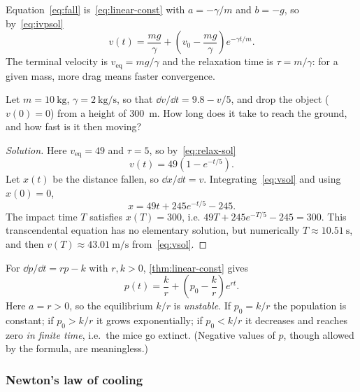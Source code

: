 \begin{eg}
	Equation~\eqref{eq:fall} is~\eqref{eq:linear-const} with \(a = -\gamma/m\) and
	\(b = -g\), so by~\eqref{eq:ivpsol}
	\[
		v(t) = \frac{mg}{\gamma} + \left( v_0 - \frac{mg}{\gamma} \right)
		e^{-\gamma t/m}.
	\]
	The terminal velocity is \(v_{\mathrm{eq}} = mg/\gamma\) and the relaxation time is
	\(\tau = m/\gamma\): for a given mass, more drag means faster convergence.
\end{eg}

\begin{eg}
	Let \(m = \SI{10}{\kilogram}\), \(\gamma = \SI{2}{\kilogram\per\second}\), so that
	\(\dd v/\dd t = 9.8 - v/5\), and drop the object (\(v(0) = 0\)) from a height of
	\SI{300}{\metre}. How long does it take to reach the ground, and how fast is it then
	moving?
\end{eg}

\begin{proof}[Solution]
	Here \(v_{\mathrm{eq}} = 49\) and \(\tau = 5\), so by~\eqref{eq:relax-sol}
	\begin{equation}\label{eq:vsol}
		v(t) = 49\left( 1 - e^{-t/5} \right).
	\end{equation}
	Let \(x(t)\) be the distance fallen, so \(\dd x/\dd t = v\). Integrating~\eqref{eq:vsol}
	and using \(x(0) = 0\),
	\[
		x = 49t + 245 e^{-t/5} - 245.
	\]
	The impact time \(T\) satisfies \(x(T) = 300\), i.e.
	\(49T + 245e^{-T/5} - 245 = 300\). This transcendental equation has no elementary
	solution, but numerically \(T \approx \SI{10.51}{\second}\), and then
	\(v(T) \approx \SI{43.01}{\metre\per\second}\) from~\eqref{eq:vsol}.
\end{proof}

\begin{eg}
	For \(\dd p/\dd t = rp - k\) with \(r, k > 0\), \autoref{thm:linear-const} gives
	\[
		p(t) = \frac{k}{r} + \left( p_0 - \frac{k}{r} \right) e^{rt}.
	\]
	Here \(a = r > 0\), so the equilibrium \(k/r\) is \emph{unstable}. If \(p_0 = k/r\)
	the population is constant; if \(p_0 > k/r\) it grows exponentially; if
	\(p_0 < k/r\) it decreases and reaches zero \emph{in finite time}, i.e.\ the mice go
	extinct. (Negative values of \(p\), though allowed by the formula, are meaningless.)
\end{eg}

\subsubsection*{Newton's law of cooling}

